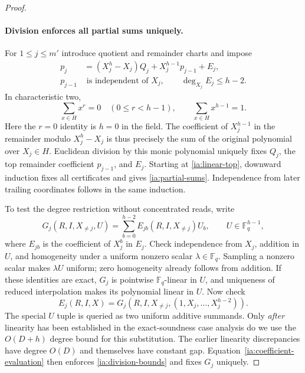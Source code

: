 \begin{proof}
\paragraph{Division enforces all partial sums uniquely.}
For $1\le j\le m'$ introduce quotient and remainder charts and impose
\begin{align}
 p_j&=(X_j^h-X_j)Q_j+X_j^{h-1}p_{j-1}+E_j,
                                                        \label{ia:division}\\
 p_{j-1}&\text{ is independent of }X_j,
 \qquad \deg_{X_j}E_j\le h-2.                       \label{ia:division-bounds}
\end{align}
In characteristic two,
\[
 \sum_{x\in H}x^r=0\quad(0\le r<h-1),\qquad
 \sum_{x\in H}x^{h-1}=1.
\]
Here the $r=0$ identity is $h=0$ in the field.  The coefficient of
$X_j^{h-1}$ in the remainder modulo $X_j^h-X_j$ is thus precisely the
sum of the original polynomial over $X_j\in H$.  Euclidean division
by this monic polynomial uniquely fixes $Q_j$, the top remainder
coefficient $p_{j-1}$, and $E_j$.  Starting at
\eqref{ia:linear-top}, downward induction fixes all certificates and
gives \eqref{ia:partial-sums}.  Independence from later trailing
coordinates follows in the same induction.

To test the degree restriction without concentrated reads, write
\begin{equation}
 G_j(R,I,X_{\ne j},U)
   =\sum_{b=0}^{h-2}E_{jb}(R,I,X_{\ne j})U_b,
 \qquad U\in\mathbb F_q^{h-1},                     \label{ia:coefficient-chart}
\end{equation}
where $E_{jb}$ is the coefficient of $X_j^b$ in $E_j$.  Check
independence from $X_j$, addition in $U$, and homogeneity under a
uniform nonzero scalar $\lambda\in\mathbb F_q$.  Sampling a nonzero
scalar makes $\lambda U$ uniform; zero homogeneity already follows
from addition.  If these identities are exact, $G_j$ is pointwise
$\mathbb F_q$-linear in $U$, and uniqueness of reduced interpolation
makes its polynomial linear in $U$.  Now check
\begin{equation}
 E_j(R,I,X)=G_j(R,I,X_{\ne j},(1,X_j,\ldots,X_j^{h-2})).
                                                               \label{ia:coefficient-evaluation}
\end{equation}
The special $U$ tuple is queried as two uniform additive summands.
Only \emph{after} linearity has been established in the exact-soundness
case analysis do we use the $O(D+h)$ degree bound for this substitution.
The earlier linearity discrepancies have degree $O(D)$ and themselves
have constant gap.  Equation~\eqref{ia:coefficient-evaluation} then
enforces \eqref{ia:division-bounds} and fixes $G_j$ uniquely.


\end{proof}
